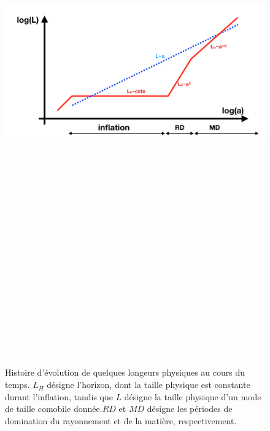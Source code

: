 \begin{figure}[htbp]
	\centering
		\includegraphics[height=25cm]{figs/inflation.png}
	\caption[Histoire d'évolution de quelques longeurs physiques au cours du temps.]{Histoire d'évolution de quelques longeurs physiques au cours du temps. $L_H$ désigne l'horizon, dont la taille physique est constante durant l'inflation, tandis que $L$ désigne la taille physique d'un mode de taille comobile donnée.$RD$ et $MD$ désigne les périodes de domination du rayonnement et de la matière, respectivement. }
	\label{f:inflation}
\end{figure}

